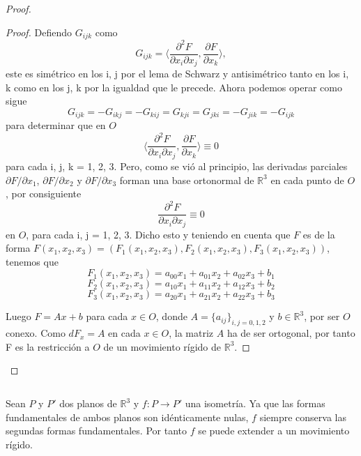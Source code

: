 \begin{proof}
\begin{proof}
		Defiendo $G_{ijk}$ como
		${ }$\\
		\[
		G_{ijk} = \langle \frac{\partial^2 F}{\partial x_i \partial x_j}, \frac{\partial F}{\partial x_k} \rangle,
		\]
		${ }$\\
		este es simétrico en los i, j por el lema de Schwarz y antisimétrico tanto en los i, k como en los j, k por la igualdad que le precede. Ahora podemos operar como sigue
		${ }$\\
		\[
		G_{ijk} = -G_{ikj} = -G_{kij} = G_{kji} = G_{jki} = -G_{jik} = -G_{ijk}
		\]
		${ }$\\
		para determinar que en $O$
		${ }$\\
		\[
		\langle \frac{\partial^2 F}{\partial x_i \partial x_j}, \frac{\partial F}{\partial x_k} \rangle \equiv 0
		\]
		${ }$\\
		para cada i, j, k = 1, 2, 3. Pero, como se vió al principio, las derivadas parciales $\partial F / \partial x_1$, $\partial F / \partial x_2$ y $\partial F / \partial x_3$ forman una base ortonormal de $\mathbb{R}^3$ en cada punto de $O$, por consiguiente
		${ }$\\
		\[
		\frac{\partial^2 F}{\partial x_i \partial x_j} \equiv 0
		\]
		${ }$\\
		en $O$, para cada  i, j = 1, 2, 3. Dicho esto y teniendo en cuenta  que $F$ es de la forma $F(x_1, x_2, x_3) = (F_1(x_1, x_2, x_3), F_2(x_1, x_2, x_3), F_3(x_1, x_2, x_3))$, tenemos que
		${ }$\\
		\[
		F_1(x_1, x_2, x_3) = a_{00}x_1 + a_{01}x_2 + a_{02}x_3 + b_1
		\]
		\[
		F_2(x_1, x_2, x_3) = a_{10}x_1 + a_{11}x_2 + a_{12}x_3 + b_2
		\]
		\[
		F_3(x_1, x_2, x_3) = a_{20}x_1 + a_{21}x_2 + a_{22}x_3 + b_3
		\]
		
		${ }$\\	
		
		Luego $F = Ax + b$ para cada $x \in O$, donde $A = \{a_{ij}\}_{i,j=0,1,2}$ y $b \in \mathbb{R}^3$, por ser $O$ conexo. Como $dF_x=A$ en cada $x \in O$, la matriz $A$ ha de ser ortogonal, por tanto F es la restricción a $O$ de un movimiento rígido de $\mathbb{R}^3$.
		
	\end{proof}
	
\end{proof}
${ }$\\



\begin{ejemplo}
		Sean $P$ y $P'$ dos planos de $\mathbb{R}^3$ y $f : P \to P'$ una isometría. Ya que las formas fundamentales de ambos planos son idénticamente nulas, $f$ siempre conserva las segundas formas fundamentales. Por tanto $f$ se puede extender a un movimiento rígido.
\end{ejemplo}
${ }$\\

